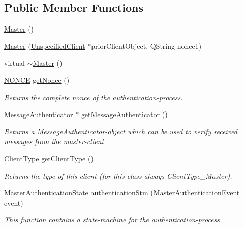 \subsection*{Public Member Functions}
\begin{DoxyCompactItemize}
\item 
\hyperlink{class_server_appl_1_1_master_afa904310825c83e664b99f4fe6af5c2f}{Master} ()
\item 
\hyperlink{class_server_appl_1_1_master_aa747df80d845d561a1dcb4ecb1921287}{Master} (\hyperlink{class_server_appl_1_1_unspecified_client}{Unspecified\+Client} $\ast$prior\+Client\+Object, Q\+String nonce1)
\item 
virtual \hyperlink{class_server_appl_1_1_master_a31306ed7f549dcb249712808b002563a}{$\sim$\+Master} ()
\item 
\hyperlink{struct_n_o_n_c_e}{N\+O\+N\+C\+E} \hyperlink{class_server_appl_1_1_master_a1ac1d9cda858d9f99295a7123653371d}{get\+Nonce} ()
\begin{DoxyCompactList}\small\item\em Returns the complete nonce of the authentication-\/process. \end{DoxyCompactList}\item 
\hyperlink{class_message_authenticator}{Message\+Authenticator} $\ast$ \hyperlink{class_server_appl_1_1_master_a8e40cceba43ab2e78bc79cbac9ed653b}{get\+Message\+Authenticator} ()
\begin{DoxyCompactList}\small\item\em Returns a Message\+Authenticator-\/object which can be used to verify received messages from the master-\/client. \end{DoxyCompactList}\item 
\hyperlink{_unspecified_client_8h_af7f22c7d662171af2c3a5b74f621dc98}{Client\+Type} \hyperlink{class_server_appl_1_1_master_a9fa7bd1e0f1770802900d10569c04b30}{get\+Client\+Type} ()
\begin{DoxyCompactList}\small\item\em Returns the type of this client (for this class always Client\+Type\+\_\+\+Master). \end{DoxyCompactList}\item 
\hyperlink{_master_8h_a33fa3e499badd7bda200e5ae6beb34d8}{Master\+Authentication\+State} \hyperlink{class_server_appl_1_1_master_a793bfbfaa7ea6143ad54e1a2b3f3b651}{authentication\+Stm} (\hyperlink{_master_8h_a6b219182cc755ee81f37301a90607094}{Master\+Authentication\+Event} event)
\begin{DoxyCompactList}\small\item\em This function contains a state-\/machine for the authentication-\/process. \end{DoxyCompactList}\item 

\end{DoxyCompactItemize}
